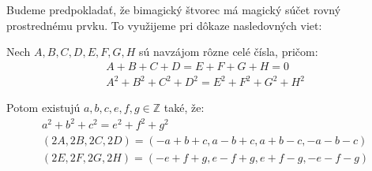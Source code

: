 

Budeme predpokladať, že bimagický štvorec má magický súčet rovný prostrednému prvku. To využijeme pri dôkaze nasledovných viet:

\begin{theorem}
\label{5x5bimagic2}
Nech $A, B, C, D, E, F, G, H$ sú navzájom rôzne celé čísla, pričom:
\begin{gather*}
A + B + C + D = E + F + G + H = 0 \\
A^2 + B^2 + C^2 + D^2 = E^2 + F^2 + G^2 + H^2
\end{gather*}

Potom existujú $a,b,c,e,f,g \in \mathbb{Z}$ také, že:
\begin{gather*}
a^2 + b^2 + c^2 = e^2 + f^2 + g^2 \\
(2A,2B,2C,2D) = (-a+b+c, a-b+c,a+b-c, -a-b-c) \\
(2E,2F,2G,2H) = (-e+f+g, e-f+g, e+f-g, -e-f-g)
\end{gather*}

\end{theorem}

